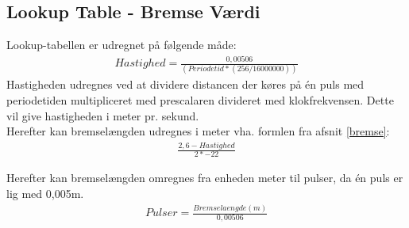 \subsection{Lookup Table - Bremse Værdi}
\label{lookup}
Lookup-tabellen er udregnet på følgende måde: \\
\begin{align*}
Hastighed = \frac{0,00506}{(Periodetid*(256/16000000))}
\end{align*}
Hastigheden udregnes ved at dividere distancen der køres på én puls med periodetiden multipliceret med prescalaren divideret med klokfrekvensen. Dette vil give hastigheden i meter pr. sekund. \\

Herefter kan bremselængden udregnes i meter vha. formlen fra afsnit \ref{bremse}: \\
\begin{align*}
\frac{2,6-Hastighed}{2*-22}
\end{align*}

Herefter kan bremselængden omregnes fra enheden meter til pulser, da én puls er lig med 0,005m. \\
\begin{align*}
Pulser = \frac{Bremselaengde(m)}{0,00506}
\end{align*}

